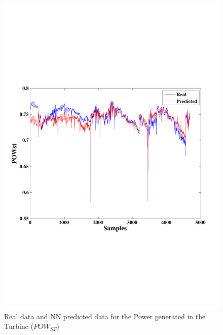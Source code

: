 \begin{figure}
\centering
\includegraphics[width=1\textwidth]{ANN-ST.pdf}
\caption{Real data and NN predicted data for the Power generated in the Turbine ($POW_{ST}$) }
\label{Pturbine}
\end{figure}

